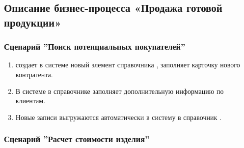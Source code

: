 



\subsection{Описание бизнес-процесса «Продажа готовой продукции»}

\subsubsection{Сценарий ''Поиск потенциальных покупателей''}
\label{bp:sales_1}

\begin{enumerate}
    \item \manager создает в системе \erp новый элемент справочника  , заполняет карточку нового контрагента.
    \item	В системе \erp в справочнике   \manager заполняет дополнительную информацию по клиентам.
    \item	Новые записи выгружаются автоматически в систему \gofro в справочник .
\end{enumerate}


\subsubsection{Сценарий ''Расчет стоимости изделия''}
\label{bp:sales_2}




